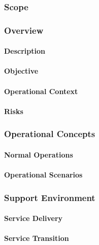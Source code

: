 
\subsubsection{Scope}

\subsubsection{Overview}

\paragraph{Description}

\paragraph{Objective}

\paragraph{Operational Context}

\paragraph{Risks}

\subsubsection{Operational Concepts}

\paragraph{Normal Operations}

\paragraph{Operational Scenarios}

\subsubsection{Support Environment}

\paragraph{Service Delivery}

\paragraph{Service Transition}
